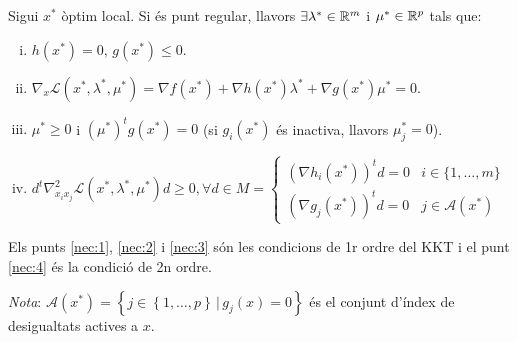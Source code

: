 \begin{prop}
    Sigui $x^*$ \`optim local. Si \'es punt regular, llavors $\exists \lambda^* \in \mathbb{R}^m$ i $\mu^* \in \mathbb{R}^p$ tals que:
    \begin{enumerate}[i)]
        \item \label{nec:1} $h\left( x^* \right) = 0,\, g\left( x^* \right) \leq 0$.
        \item \label{nec:2} $\nabla_x \mathcal{L}\left( x^*, \lambda^*, \mu^* \right) = \nabla f\left( x^* \right) + \nabla h\left( x^* \right) \lambda^* + \nabla g\left( x^* \right)\mu^* = 0$.
        \item \label{nec:3} $\mu^* \geq 0$ i $\left( \mu^* \right)^t g\left( x^* \right) = 0$ (si $g_i\left( x^* \right)$ \'es inactiva, llavors $\mu_j^* = 0$).
        \item \label{nec:4} $d^t \nabla_{x_ix_j}^2 \mathcal{L} \left( x^*, \lambda^*, \mu^* \right) d \geq 0, \forall d\in M =
            \begin{cases}
                \left( \nabla h_i\left( x^* \right) \right)^t d = 0 & i \in \{1,\dots,m\} \\
                \left( \nabla g_j\left( x^* \right) \right)^t d = 0 & j \in \mathcal{A}\left( x^* \right)
            \end{cases}$ \\
    \end{enumerate}
    Els punts \ref{nec:1}, \ref{nec:2} i \ref{nec:3} s\'on les condicions de 1r ordre del KKT i el punt \ref{nec:4} \'es la condici\'o de 2n ordre.
    \begin{adjustwidth}{1cm}{}
    {\it Nota}: $\mathcal{A}\left( x^* \right) = \left\{ j \in \left\{ 1, \dots, p \right\} \, |\, g_j \left( x \right) = 0\right\}$ \'es el conjunt d'\'index de desigualtats actives a $x$.
    \end{adjustwidth}
\end{prop}
